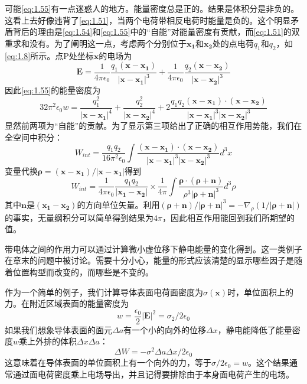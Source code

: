 \documentclass[12pt]{book}
\numberwithin{equation}{chapter}
\numberwithin{figure}{chapter}
\numberwithin{footnote}{page}
\begin{document}
可能\autoref{eq:1.55}有一点迷惑人的地方。能量密度总是正的。结果是体积分是非负的。这看上去好像违背了\autoref{eq:1.51}，当两个电荷带相反电荷时能量是负的。这个明显矛盾背后的理由是\autoref{eq:1.54}和\autoref{eq:1.55}中的“自能”对能量密度有贡献，而\autoref{eq:1.51}的双重求和没有。为了阐明这一点，考虑两个分别位于$\mathbf{x_1}$和$\mathbf{x_2}$处的点电荷$q_1$和$q_2$，如\autoref{eq:1.8}所示。点P处坐标$\mathbf{x}$的电场为
$$\mathbf{E}=\frac{1}{4\pi\epsilon_0}\frac{q_1(\mathbf{x}-\mathbf{x_1})}{|\mathbf{x}-\mathbf{x_1}|^3}+\frac{1}{4\pi\epsilon_0}\frac{q_2(\mathbf{x}-\mathbf{x_2})}{|\mathbf{x}-\mathbf{x_2}|^3}$$
因此\autoref{eq:1.55}的能量密度为
\begin{equation}\label{eq:1.56}
    32\pi^2\epsilon_0w=\frac{q_1^2}{|\mathbf{x}-\mathbf{x_1}|^4}+\frac{q_2^2}{|\mathbf{x}-\mathbf{x_2}|^4}+2\frac{q_1q_2(\mathbf{x}-\mathbf{x_1})\cdot(\mathbf{x}-\mathbf{x_2})}{|\mathbf{x}-\mathbf{x_1}|^3|\mathbf{x}-\mathbf{x_2}|^3}
\end{equation}
显然前两项为“自能”的贡献。为了显示第三项给出了正确的相互作用势能，我们在全空间中积分：
\begin{equation}\label{eq:1.57}
    W_{int}=\frac{q_1q_2}{16\pi^2\epsilon_0}\int \frac{(\mathbf{x}-\mathbf{x_1})\cdot(\mathbf{x}-\mathbf{x_2})}{|\mathbf{x}-\mathbf{x_1}|^3|\mathbf{x}-\mathbf{x_2}|^3}d^3x
\end{equation}
变量代换$\mathbf{\rho}=(\mathbf{x}-\mathbf{x_1})/|\mathbf{x}-\mathbf{x_1}|$得到
\begin{equation}\label{eq:1.58}
    W_{int}=\frac{1}{4\pi\epsilon_0}\frac{q_1q_2}{|\mathbf{x_1}-\mathbf{x_2}|}\times\frac{1}{4\pi}\int\frac{\mathbf{\rho}\cdot(\mathbf{\rho}+\mathbf{n})}{\rho^3|\mathbf{\rho}+\mathbf{n}|^3}d^3\rho
\end{equation}
其中$\mathbf{n}$是$(\mathbf{x_1}-\mathbf{x_2})$的方向单位矢量。利用$(\mathbf{\rho}+\mathbf{n})/|\mathbf{\rho}+\mathbf{n}|^3=-\nabla_{\rho}(1/|\mathbf{\rho}+\mathbf{n}|)$的事实，无量纲积分可以简单得到结果为$4\pi$，因此相互作用能回到我们所期望的值。

带电体之间的作用力可以通过计算微小虚位移下静电能量的变化得到。这一类例子在章末的问题中被讨论。需要十分小心，能量的形式应该清楚的显示哪些因子是随着位置构型而改变的，而哪些是不变的。

作为一个简单的例子，我们计算导体表面电荷面密度为$\sigma(\mathbf{x})$时，单位面积上的力。在附近区域表面的能量密度为
\begin{equation}\label{eq:1.59}
    w=\frac{\epsilon_0}{2}|\mathbf{E}|^2=\sigma_2/2\epsilon_0
\end{equation}
如果我们想象导体表面的面元$\Delta a$有一个小的向外的位移$\Delta x$，静电能降低了能量密度$w$乘上外排的体积$\Delta x\Delta a$：
\begin{equation}\label{eq:1.60}
    \Delta W=-\sigma^2\Delta a\Delta x/2\epsilon_0
\end{equation}
这意味着在导体表面的单位面积上有一个向外的力，等于$\sigma/2\epsilon_0=w$。这个结果通常通过面电荷密度乘上电场导出，并且记得要排除由于本身面电荷产生的电场。
\end{document}
